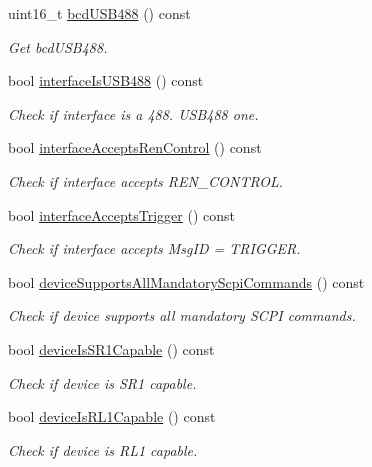 \begin{DoxyCompactItemize}
uint16\-\_\-t \hyperlink{classmdt_usbtmc_control_transfer_a38c6f71d406c56049130d23847b9badf}{bcd\-U\-S\-B488} () const 
\begin{DoxyCompactList}\small\item\em Get bcd\-U\-S\-B488. \end{DoxyCompactList}\item 
bool \hyperlink{classmdt_usbtmc_control_transfer_a68d6a2b8f2cd4aa84b6d718094879459}{interface\-Is\-U\-S\-B488} () const 
\begin{DoxyCompactList}\small\item\em Check if interface is a 488. U\-S\-B488 one. \end{DoxyCompactList}\item 
bool \hyperlink{classmdt_usbtmc_control_transfer_affa393eda32d107679a1648cc4e9eb3f}{interface\-Accepts\-Ren\-Control} () const 
\begin{DoxyCompactList}\small\item\em Check if interface accepts R\-E\-N\-\_\-\-C\-O\-N\-T\-R\-O\-L. \end{DoxyCompactList}\item 
bool \hyperlink{classmdt_usbtmc_control_transfer_ab9d9126ac41e8bc336d923c526f9eba5}{interface\-Accepts\-Trigger} () const 
\begin{DoxyCompactList}\small\item\em Check if interface accepts Msg\-I\-D = T\-R\-I\-G\-G\-E\-R. \end{DoxyCompactList}\item 
bool \hyperlink{classmdt_usbtmc_control_transfer_a8a882499daf970c5f1755abe496edf06}{device\-Supports\-All\-Mandatory\-Scpi\-Commands} () const 
\begin{DoxyCompactList}\small\item\em Check if device supports all mandatory S\-C\-P\-I commands. \end{DoxyCompactList}\item 
bool \hyperlink{classmdt_usbtmc_control_transfer_a95a492d4c4ddd1034e0c4862a3a37d70}{device\-Is\-S\-R1\-Capable} () const 
\begin{DoxyCompactList}\small\item\em Check if device is S\-R1 capable. \end{DoxyCompactList}\item 
bool \hyperlink{classmdt_usbtmc_control_transfer_a6dcc03f0b46222830550dae9fba91eeb}{device\-Is\-R\-L1\-Capable} () const 
\begin{DoxyCompactList}\small\item\em Check if device is R\-L1 capable. \end{DoxyCompactList}\item 

\end{DoxyCompactItemize}
